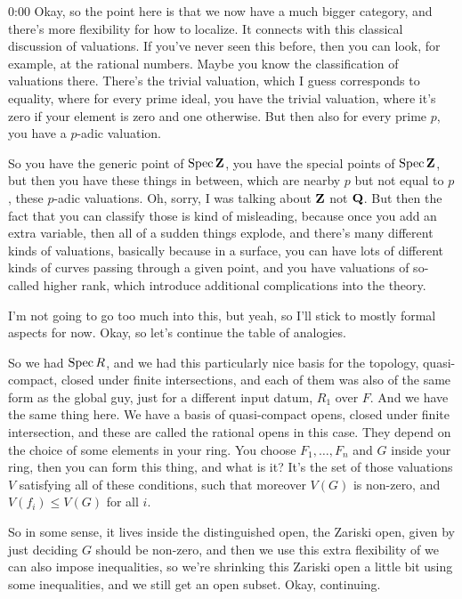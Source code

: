 \begin{unfinished}{0:00}
Okay, so the point here is that we now have a much bigger category, and there's more flexibility for how to localize. It connects with this classical discussion of valuations. If you've never seen this before, then you can look, for example, at the rational numbers. Maybe you know the classification of valuations there. There's the trivial valuation, which I guess corresponds to equality, where for every prime ideal, you have the trivial valuation, where it's zero if your element is zero and one otherwise. But then also for every prime $p$, you have a $p$-adic valuation.

So you have the generic point of $\operatorname{Spec} \mathbf Z$, you have the special points of $\operatorname{Spec} \mathbf Z$, but then you have these things in between, which are nearby $p$ but not equal to $p$, these $p$-adic valuations. Oh, sorry, I was talking about $\mathbf Z$ not $\mathbf Q$. But then the fact that you can classify those is kind of misleading, because once you add an extra variable, then all of a sudden things explode, and there's many different kinds of valuations, basically because in a surface, you can have lots of different kinds of curves passing through a given point, and you have valuations of so-called higher rank, which introduce additional complications into the theory. 

I'm not going to go too much into this, but yeah, so I'll stick to mostly formal aspects for now. Okay, so let's continue the table of analogies.

So we had $\operatorname{Spec} R$, and we had this particularly nice basis for the topology, quasi-compact, closed under finite intersections, and each of them was also of the same form as the global guy, just for a different input datum, $R_1$ over $F$. And we have the same thing here. We have a basis of quasi-compact opens, closed under finite intersection, and these are called the rational opens in this case. They depend on the choice of some elements in your ring. You choose $F_1, \dots, F_n$ and $G$ inside your ring, then you can form this thing, and what is it? It's the set of those valuations $V$ satisfying all of these conditions, such that moreover $V(G)$ is non-zero, and $V(f_i) \leq V(G)$ for all $i$.

So in some sense, it lives inside the distinguished open, the Zariski open, given by just deciding $G$ should be non-zero, and then we use this extra flexibility of we can also impose inequalities, so we're shrinking this Zariski open a little bit using some inequalities, and we still get an open subset. Okay, continuing.


\end{unfinished}
